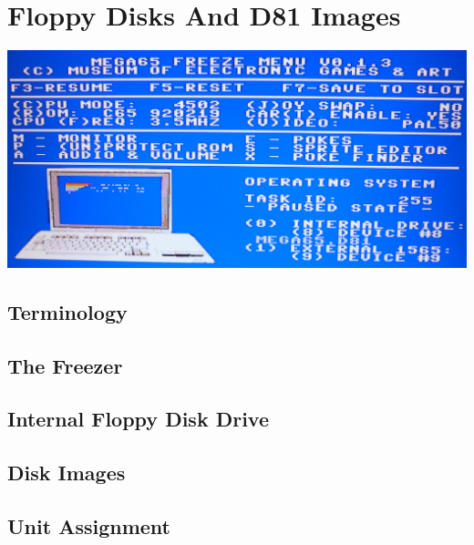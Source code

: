 \chapter{Floppy Disks And D81 Images}
\label{cha:freezer}


\includegraphics[width=\linewidth]{images/freezer.jpg}

\section{Terminology}

\section{The Freezer}

\section{Internal Floppy Disk Drive}

\section{Disk Images}

\section{Unit Assignment}


